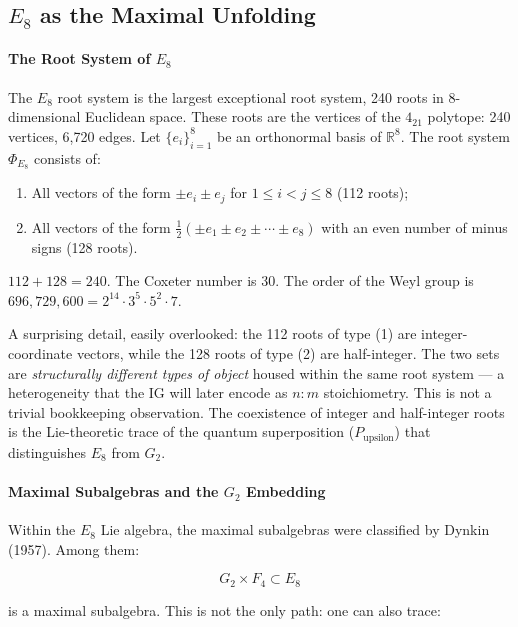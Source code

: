 \documentclass[12pt,a4paper]{article}
\begin{document}
\subsection{$E_8$ as the Maximal Unfolding}

\paragraph{The Root System of $E_8$}

The $E_8$ root system is the largest exceptional root system, 240 roots in 8-dimensional Euclidean space. These roots are the vertices of the $4_{21}$ polytope: 240 vertices, 6,720 edges. Let $\{e_i\}_{i=1}^8$ be an orthonormal basis of $\mathbb{R}^8$. The root system $\Phi_{E_8}$ consists of:

\begin{enumerate}
    \item All vectors of the form $\pm e_i \pm e_j$ for $1 \leq i < j \leq 8$ (112 roots);
    \item All vectors of the form $\frac{1}{2}(\pm e_1 \pm e_2 \pm \cdots \pm e_8)$ with an even number of minus signs (128 roots).
\end{enumerate}

$112 + 128 = 240$. The Coxeter number is 30. The order of the Weyl group is $696{,}729{,}600 = 2^{14} \cdot 3^5 \cdot 5^2 \cdot 7$.

A surprising detail, easily overlooked: the 112 roots of type (1) are integer-coordinate vectors, while the 128 roots of type (2) are half-integer. The two sets are \emph{structurally different types of object} housed within the same root system --- a heterogeneity that the IG will later encode as $n{:}m$ stoichiometry. This is not a trivial bookkeeping observation. The coexistence of integer and half-integer roots is the Lie-theoretic trace of the quantum superposition ($P_{\text{upsilon}}$) that distinguishes $E_8$ from $G_2$.

\paragraph{Maximal Subalgebras and the $G_2$ Embedding}

Within the $E_8$ Lie algebra, the maximal subalgebras were classified by Dynkin (1957). Among them:

\[G_2 \times F_4 \subset E_8\]

is a maximal subalgebra. This is not the only path: one can also trace:
\end{document}
